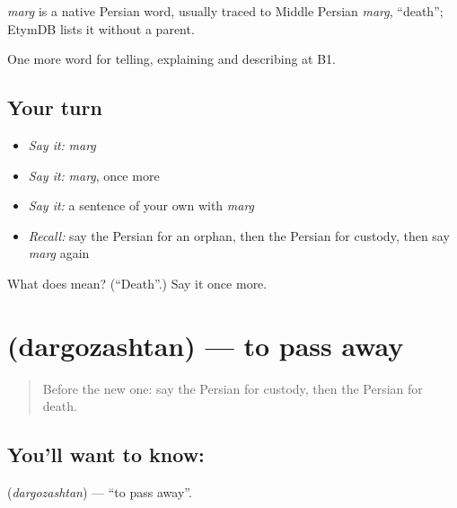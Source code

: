 \begin{cousinweb}
\emph{marg} is a native Persian word, usually traced to Middle Persian \emph{marg}, \textquotedblleft{}death\textquotedblright{}; EtymDB lists it without a parent.
\end{cousinweb}

\begin{grammarlens}[title={What you've built}]
One more word for telling, explaining and describing at B1.
\end{grammarlens}

\subsection*{Your turn}
\begin{itemize}
\raggedright
  \item \emph{Say it:} \emph{marg}
  \item \emph{Say it:} \emph{marg}, once more
  \item \emph{Say it:} a sentence of your own with \emph{marg}
  \item \emph{Recall:} say the Persian for an orphan, then the Persian for custody, then say \emph{marg} again
\end{itemize}

\begin{tcolorbox}[breakable,colback=teal!4,colframe=teal!35!black,title={Before you move on}]
What does  mean? (\textquotedblleft{}Death\textquotedblright{}.) Say it once more.
\end{tcolorbox}
\section[\texorpdfstring{\fa{درگذشتن} (dargozashtan)}{درگذشتن (dargozashtan)}]{ (dargozashtan) — to pass away}

\label{lesson:FA-C337-dargozashtan}



\begin{quote}
Before the new one: say the Persian for custody, then the Persian for death.
\end{quote}

\subsection*{You'll want to know: }
\textbf{} (\emph{dargozashtan}) — \textquotedblleft{}to pass away\textquotedblright{}.

